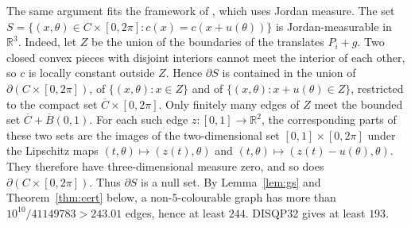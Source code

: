 \documentclass[10pt,a4paper]{article}
\newcommand{\R}{\mathbb{R}}
\begin{document}
The same argument fits the framework of \cite{GS}, which uses Jordan measure. The set
$S=\{(x,\theta)\in C\times[0,2\pi]:c(x)=c(x+u(\theta))\}$ is Jordan-measurable in $\R^3$. Indeed, let
$Z$ be the union of the boundaries of the translates $P_i+g$. Two closed convex pieces with disjoint
interiors cannot meet the interior of each other, so $c$ is locally constant outside $Z$. Hence
$\partial S$ is contained in the union of $\partial(C\times[0,2\pi])$, of $\{(x,\theta):x\in Z\}$ and of
$\{(x,\theta):x+u(\theta)\in Z\}$, restricted to the compact set $\overline C\times[0,2\pi]$. Only
finitely many edges of $Z$ meet the bounded set $\overline C+\overline{B}(0,1)$. For each such edge
$z:[0,1]\to\R^2$, the corresponding parts of these two sets are the images of the two-dimensional set
$[0,1]\times[0,2\pi]$ under the Lipschitz maps $(t,\theta)\mapsto(z(t),\theta)$ and
$(t,\theta)\mapsto(z(t)-u(\theta),\theta)$. They therefore have three-dimensional measure zero, and so
does $\partial(C\times[0,2\pi])$. Thus $\partial S$ is a null set. By Lemma~\ref{lem:gs} and
Theorem~\ref{thm:cert} below, a non-$5$-colourable graph has more than $10^{10}/41149783>243.01$ edges,
hence at least $244$. DISQP32 gives at least $193$.
\end{document}
